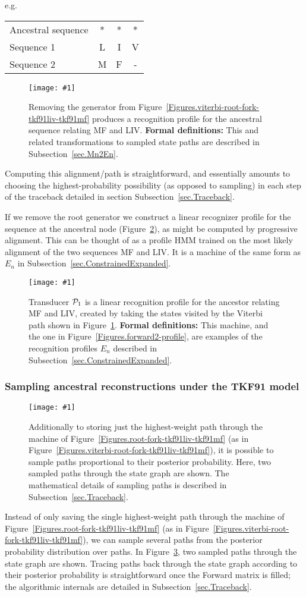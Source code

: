 \documentclass{article}
\newcommand{\secref}[1]{Subsection~\ref{sec.#1}}
\newcommand{\figref}[1]{Figure~\ref{Figures.#1}}
\newcommand{\figlabel}[1]{\label{Figures.#1}}
\newcommand{\easyfig}[4]{
\begin{figure}
\texttt{[image: \#1]}
\caption{ \figlabel{#3} #4}
\end{figure}}
\newcommand{\widepngfig}[2]{\easyfig{#1.png}{width=\textwidth}{#1}{#2}}
\newcommand{\widepdffig}[2]{\easyfig{#1-fig.pdf}{width=\textwidth}{#1}{#2}}
\newcommand{\tallpdffig}[2]{\easyfig{#1-fig.pdf}{height=.8\textheight}{#1}{#2}}
\newcommand\profile{{\cal P}}
\newcommand\formaldefs{{\bf Formal definitions: }}
\begin{document}
e.g.
\begin{tabular}{lccc}
Ancestral sequence & * & * & * \\
Sequence 1         & L & I & V \\
Sequence 2         & M & F & -
\end{tabular}

\widepdffig{viterbi-fork-tkf91liv-tkf91mf}{Removing the generator from \figref{viterbi-root-fork-tkf91liv-tkf91mf} produces a 
recognition profile for the ancestral sequence relating MF and LIV. 
\formaldefs
This and related transformations to sampled state paths are described in \secref{Mn2En}.}

Computing this alignment/path is straightforward, and essentially amounts to choosing
the highest-probability possibility (as opposed to sampling) 
in each step of the traceback detailed in
section \secref{Traceback}.  

If we remove  the root generator we  construct a linear recognizer profile
for the sequence at the ancestral node (\figref{viterbi-profile}),
as might be computed by progressive alignment.  
This can be thought of as a profile HMM trained on the most likely alignment 
of the two sequences MF and LIV.  
It is a machine of the same form as $E_n$ in \secref{ConstrainedExpanded}.  

\tallpdffig{viterbi-profile}{Transducer $\profile_1$ is a linear recognition profile for the 
ancestor relating MF and LIV, created by taking the states visited by the Viterbi path shown in \figref{viterbi-fork-tkf91liv-tkf91mf}.
\formaldefs
This machine, and the one in \figref{forward2-profile}, are examples of the recognition profiles $E_n$ described in \secref{ConstrainedExpanded}.  }


\subsubsection{Sampling ancestral reconstructions under the TKF91 model}

\widepngfig{forward2-root-fork-tkf91liv-tkf91mf}{
Additionally to storing just the highest-weight path through
the machine of \figref{root-fork-tkf91liv-tkf91mf}
(as in \figref{viterbi-root-fork-tkf91liv-tkf91mf}),
it is possible to sample paths proportional to their posterior probability.  
Here, two sampled paths through the state graph are shown. 
The mathematical details of sampling paths is described in \secref{Traceback}.}

Instead of only saving the single highest-weight path through
the machine of \figref{root-fork-tkf91liv-tkf91mf}
(as in \figref{viterbi-root-fork-tkf91liv-tkf91mf}),
we can sample several paths from the posterior probability distribution over paths.  
In \figref{forward2-root-fork-tkf91liv-tkf91mf}, two sampled paths through the 
state graph are shown.  
Tracing paths back through the state graph according to their posterior probability
is straightforward once the Forward matrix is filled; 
the algorithmic internals are detailed in \secref{Traceback}. 
\end{document}
